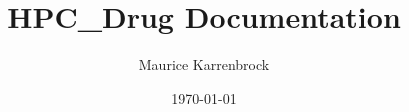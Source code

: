 \documentclass[a4paper,12pt,oneside]{book}
\begin{document}
		\title{HPC\_Drug Documentation}
		\author{Maurice Karrenbrock}
		\date{\today}
		\maketitle

\clearpage\null\thispagestyle{empty}\newpage
	
\tableofcontents

\mainmatter


	




%
\backmatter




\end{document}
